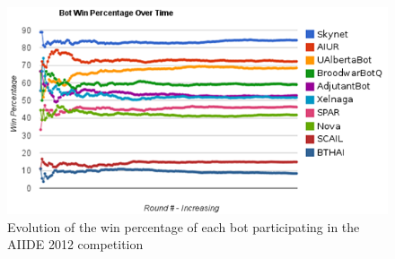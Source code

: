 \documentclass{llncs}
\begin{document}

\begin{figure}[t!]
    \centering
    \includegraphics[width=\columnwidth]{figures/aiide2012_v2}
    \caption{Evolution of the win percentage of each bot participating in the AIIDE 2012 competition}
    \label{fig:aiide2012}
\end{figure}



\end{document}

